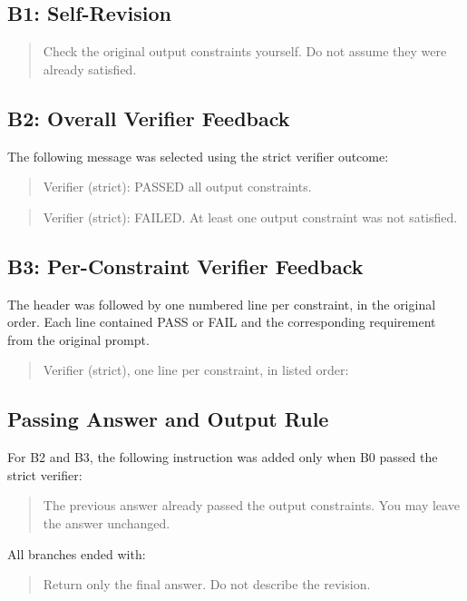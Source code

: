 \subsection{B1: Self-Revision}
\begin{quote}
Check the original output constraints yourself. Do not assume they were already satisfied.
\end{quote}

\subsection{B2: Overall Verifier Feedback}
The following message was selected using the strict verifier outcome:
\begin{quote}
Verifier (strict): PASSED all output constraints.
\end{quote}
\begin{quote}
Verifier (strict): FAILED. At least one output constraint was not satisfied.
\end{quote}

\subsection{B3: Per-Constraint Verifier Feedback}
The header was followed by one numbered line per constraint, in the original order. Each line contained PASS or FAIL and the corresponding requirement from the original prompt.
\begin{quote}
Verifier (strict), one line per constraint, in listed order:
\end{quote}

\subsection{Passing Answer and Output Rule}
For B2 and B3, the following instruction was added only when B0 passed the strict verifier:
\begin{quote}
The previous answer already passed the output constraints. You may leave the answer unchanged.
\end{quote}
All branches ended with:
\begin{quote}
Return only the final answer. Do not describe the revision.
\end{quote}
